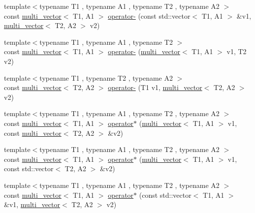 \begin{DoxyCompactItemize}
\item 
{\footnotesize template$<$typename T1 , typename A1 , typename T2 , typename A2 $>$ }\\const \hyperlink{classIceBRG_1_1multi__vector}{multi\-\_\-vector}$<$ T1, A1 $>$ \hyperlink{namespaceIceBRG_a0702c555cb23a263c1ff00cdaea34f6c}{operator-\/} (const std\-::vector$<$ T1, A1 $>$ \&v1, \hyperlink{classIceBRG_1_1multi__vector}{multi\-\_\-vector}$<$ T2, A2 $>$ v2)
\item 
{\footnotesize template$<$typename T1 , typename A1 , typename T2 $>$ }\\const \hyperlink{classIceBRG_1_1multi__vector}{multi\-\_\-vector}$<$ T1, A1 $>$ \hyperlink{namespaceIceBRG_ad9f2edab0f323edcf75b29603b5953f6}{operator-\/} (\hyperlink{classIceBRG_1_1multi__vector}{multi\-\_\-vector}$<$ T1, A1 $>$ v1, T2 v2)
\item 
{\footnotesize template$<$typename T1 , typename T2 , typename A2 $>$ }\\const \hyperlink{classIceBRG_1_1multi__vector}{multi\-\_\-vector}$<$ T2, A2 $>$ \hyperlink{namespaceIceBRG_ab6f562c73028eb890e26e18c80a131ca}{operator-\/} (T1 v1, \hyperlink{classIceBRG_1_1multi__vector}{multi\-\_\-vector}$<$ T2, A2 $>$ v2)
\item 
{\footnotesize template$<$typename T1 , typename A1 , typename T2 , typename A2 $>$ }\\const \hyperlink{classIceBRG_1_1multi__vector}{multi\-\_\-vector}$<$ T1, A1 $>$ \hyperlink{namespaceIceBRG_a46636b1c68a548740eb744c5e14a5af8}{operator$\ast$} (\hyperlink{classIceBRG_1_1multi__vector}{multi\-\_\-vector}$<$ T1, A1 $>$ v1, const \hyperlink{classIceBRG_1_1multi__vector}{multi\-\_\-vector}$<$ T2, A2 $>$ \&v2)
\item 
{\footnotesize template$<$typename T1 , typename A1 , typename T2 , typename A2 $>$ }\\const \hyperlink{classIceBRG_1_1multi__vector}{multi\-\_\-vector}$<$ T1, A1 $>$ \hyperlink{namespaceIceBRG_a8970349c8399f859b43145564b36fd51}{operator$\ast$} (\hyperlink{classIceBRG_1_1multi__vector}{multi\-\_\-vector}$<$ T1, A1 $>$ v1, const std\-::vector$<$ T2, A2 $>$ \&v2)
\item 
{\footnotesize template$<$typename T1 , typename A1 , typename T2 , typename A2 $>$ }\\const \hyperlink{classIceBRG_1_1multi__vector}{multi\-\_\-vector}$<$ T1, A1 $>$ \hyperlink{namespaceIceBRG_a53dbde352dc28555860e0e453beb61bb}{operator$\ast$} (const std\-::vector$<$ T1, A1 $>$ \&v1, \hyperlink{classIceBRG_1_1multi__vector}{multi\-\_\-vector}$<$ T2, A2 $>$ v2)

\end{DoxyCompactItemize}
